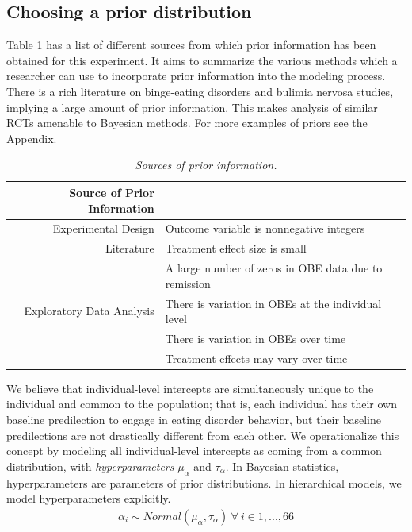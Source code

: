 \documentclass{article}
\begin{document}
\subsection*{Choosing a prior distribution}
Table 1 has a list of different sources from which prior information has been obtained for this experiment. It aims to summarize the various methods which a researcher can use to incorporate prior information into the modeling process. There is a rich literature on binge-eating disorders and bulimia nervosa studies, implying a large amount of prior information. This makes analysis of similar RCTs amenable to Bayesian methods. For more examples of priors see the Appendix.
%
\begin{table}[H]
\centering
\begin{tabular}{r l}
  Source of Prior Information &  \\ 
  \hline  \vspace{0.25em}
  Experimental Design & Outcome variable is nonnegative integers \\
  \vspace{0.25em}
  Literature & Treatment effect size is small \\
                  & A large number of zeros in OBE data due to remission\\
  Exploratory Data Analysis & There is variation in OBEs at the individual level \\
					  & There is variation in OBEs over time \\
                                            & Treatment effects may vary over time \\
    \hline
\end{tabular}
\caption{\emph{Sources of prior information.}}
\end{table}
%
We believe that individual-level intercepts are simultaneously unique to the individual and common to the population; that is, each individual has their own baseline predilection to engage in eating disorder behavior, but their baseline predilections are not drastically different from each other.  We operationalize this concept by modeling all individual-level intercepts as coming from a common distribution, with \emph{hyperparameters} $\mu_{\alpha}$ and $\tau_{\alpha}$.  In Bayesian statistics, hyperparameters are parameters of prior distributions.  In hierarchical models, we model hyperparameters explicitly.
%
\begin{align}
\alpha_i \sim Normal(\mu_{\alpha}, \tau_{\alpha}) \ \forall \ i \in 1,...,66
\end{align} 
\end{document}
